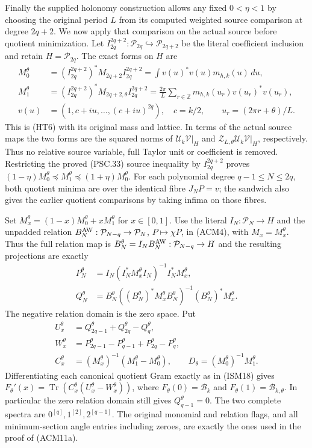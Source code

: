 Finally the supplied holonomy construction allows any fixed
$0<\eta<1$ by choosing the original period $L$ from its computed
weighted source comparison at degree $2q+2$. We now apply that
comparison on the actual source before quotient minimization.
Let $I_{2q}^{2q+2}:\mathcal P_{2q}\hookrightarrow\mathcal P_{2q+2}$
be the literal coefficient inclusion and retain $H=\mathcal P_{2q}$.
The exact forms on $H$ are
\[
\begin{split}
 M_0^\theta&=(I_{2q}^{2q+2})^*M_{2q+2}I_{2q}^{2q+2}
       =\int v(u)^*v(u)m_{h,k}(u)\,du,\\
 M_1^\theta&=(I_{2q}^{2q+2})^*M_{2q+2,\theta}I_{2q}^{2q+2}
       =\frac{2\pi}{L}\sum_{r\in\mathbb Z}
          m_{h,k}(u_r)v(u_r)^*v(u_r),\\
 v(u)&=(1,c+iu,\ldots,(c+iu)^{2q}),\quad c=k/2,
       \qquad u_r=(2\pi r+\theta)/L.
\end{split}
\tag{HC14a}
\]
This is (HT6) with its original mass and lattice. In terms of the
actual source maps the two forms are the squared norms of
$\mathcal U_k\mathcal V|_H$ and
$\mathcal Z_{L,\theta}\mathcal U_k\mathcal V|_H$, respectively.
Thus no relative source variable, full Taylor unit or coefficient
is removed. Restricting the proved (PSC.33) source inequality by
$I_{2q}^{2q+2}$ proves
$(1-\eta)M_0^\theta\preceq M_1^\theta\preceq(1+\eta)M_0^\theta$.
For each polynomial degree $q-1\leq N\leq2q$, both quotient minima are over
the identical fibre $J_NP=v$; the sandwich also gives the earlier
quotient comparisons by taking infima on those fibres.

Set $M_x^\theta=(1-x)M_0^\theta+xM_1^\theta$ for $x\in[0,1]$.
Use the literal $I_N:\mathcal P_N\to H$ and the unpadded relation
$B_N^{\rm AW}:\mathcal P_{N-q}\to\mathcal P_N$, $P\mapsto\chi P$,
in (ACM4), with $M_x=M_x^\theta$. Thus the full relation map is
$B_N^\theta=I_NB_N^{\rm AW}:\mathcal P_{N-q}\to H$ and the
resulting projections are exactly
\[
\begin{split}
 P_N^\theta&=I_N(I_N^*M_x^\theta I_N)^{-1}I_N^*M_x^\theta,\\
 Q_N^\theta&=B_N^\theta((B_N^\theta)^*M_x^\theta B_N^\theta)^{-1}
                                      (B_N^\theta)^*M_x^\theta.
\end{split}
\]
The negative relation domain is the zero space. Put
\[
\begin{split}
 U_x^\theta&=Q_{2q-1}^\theta+Q_{2q}^\theta-Q_q^\theta,\\
 W_x^\theta&=P_{2q-1}^\theta-P_{q-1}^\theta
                         +P_{2q}^\theta-P_q^\theta,\\
 C_x^\theta&=(M_x^\theta)^{-1}(M_1^\theta-M_0^\theta),\qquad
 D_\theta=(M_0^\theta)^{-1}M_1^\theta.
\end{split}
\tag{HC14b}
\]
Differentiating each canonical quotient Gram exactly as in (ISM18)
gives
$F_\theta'(x)=\operatorname{Tr}(C_x^\theta(U_x^\theta-W_x^\theta))$,
where $F_\theta(0)=\mathcal B_k$ and
$F_\theta(1)=\mathcal B_{k,\theta}$. In particular the zero relation
domain still gives $Q_{q-1}^\theta=0$. The two complete spectra are
$0^{[q]},1^{[2]},2^{[q-1]}$. The original monomial and relation flags,
and all minimum-section angle entries including zeroes, are exactly
the ones used in the proof of (ACM11a).

